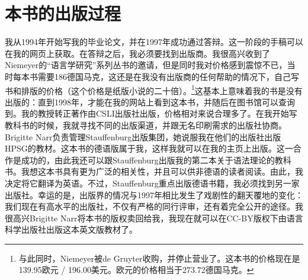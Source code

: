 \section*{本书的出版过程}

我从1994年开始写我的毕业论文，并在1997年成功通过答辩。这一阶段的手稿可以在我的网页上获取。在答辩之后，我必须要找到出版商。我很高兴收到了Niemeyer的“语言学研究”系列丛书的邀请，但是同时我对价格感到震惊不已，当时每本书需要186德国马克，这还是在我没有出版商的任何帮助的情况下，自己写书和排版的价格（这个价格是纸版小说的二十倍）。\footnote{%
与此同时，Niemeyer被de Gruyter收购，并停止营业了。这本书的价格现在是139.95欧元 / 196.00美元。欧元的价格相当于273.72德国马克。
}这基本上意味着我的书是没有出版的：直到1998年，才能在我的网站上看到这本书，并随后在图书馆可以查询到。我的教授转正著作由CSLI出版社出版，价格相对来说合理多了。在我开始写教科书的时候，我就寻找不同的出版渠道，并跟无名印刷需求的出版社协商。Brigitte Narr负责管理Stauffenburg出版集团，她说服我在他们的出版社出版HPSG的教材。这本书的德语版属于我，这样我就可以在我的主页上出版。这一合作是成功的，由此我还可以跟Stauffenburg出版我的第二本关于语法理论的教科书。我想这本书具有更为广泛的相关性，并且可以供非德语的读者阅读。由此，我决定将它翻译为英语。不过，Stauffenburg重点出版德语书籍，我必须找到另一家出版社。幸运的是，出版界的情况与1997年相比发生了戏剧性的翻天覆地的变化：我们现在有高水平的出版社，不仅有严格的同行评审，还有着完全公开的途径。我很高兴Brigitte Narr将本书的版权卖回给我，我现在就可以在CC-BY版权下由语言科学出版社出版这本英文版教材了。
